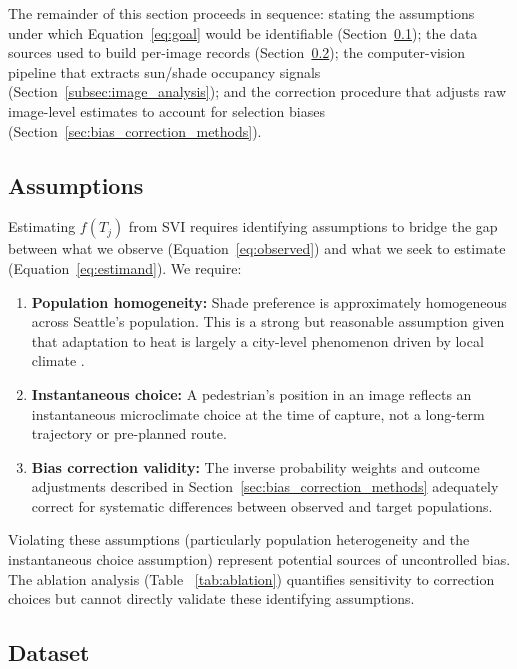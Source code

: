 \documentclass{ifacconf}
\begin{document}
  The remainder of this section proceeds in sequence: stating the assumptions under which Equation~\eqref{eq:goal}
  would be identifiable (Section~\ref{subsec:assumptions}); the data sources used to build per-image records
  (Section~\ref{subsec:dataset}); the computer-vision pipeline that extracts sun/shade occupancy signals
  (Section~\ref{subsec:image_analysis}); and the correction procedure that adjusts raw image-level estimates to account for selection
   biases (Section~\ref{sec:bias_correction_methods}).

  \subsection{Assumptions}
  \label{subsec:assumptions}

  Estimating $f(T_j)$ from SVI requires identifying assumptions to bridge the gap between what we observe
  (Equation~\eqref{eq:observed}) and what we seek to estimate (Equation~\eqref{eq:estimand}). We require:

  \begin{enumerate}[leftmargin=*,itemsep=2pt]
  \item \textbf{Population homogeneity:} Shade preference is approximately homogeneous across Seattle's population. This is a strong
  but reasonable assumption given that adaptation to heat is largely a city-level phenomenon driven by local climate
  \citep{Bobb2014HeatRelated}.

  \item \textbf{Instantaneous choice:} A pedestrian's position in an image reflects an instantaneous microclimate choice at the time
  of capture, not a long-term trajectory or pre-planned route.

  \item \textbf{Bias correction validity:} The inverse probability weights and outcome adjustments described in
  Section~\ref{sec:bias_correction_methods} adequately correct for systematic differences between observed and target populations.
  \end{enumerate}

  Violating these assumptions (particularly population heterogeneity and the instantaneous choice assumption) represent
  potential sources of uncontrolled bias. The ablation analysis (Table ~\ref{tab:ablation}) quantifies sensitivity to correction
  choices but cannot directly validate these identifying assumptions.

  \subsection{Dataset}
  \label{subsec:dataset}
\end{document}

